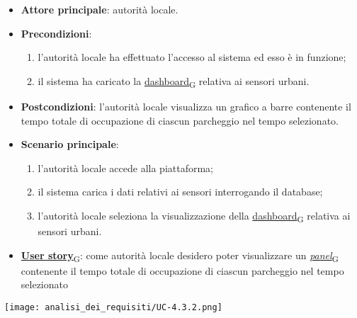 \newpage
{}
\begin{itemize}
	\item \textbf{Attore principale}: autorità locale.
	\item \textbf{Precondizioni}:
	      \begin{enumerate}
		      \item l'autorità locale ha effettuato l'accesso al sistema ed esso è in funzione;
		      \item il sistema ha caricato la \href{https://7last.github.io/docs/pb/documentazione-interna/glossario\#dashboard}{dashboard\textsubscript{G}} relativa ai sensori urbani.
	      \end{enumerate}
	\item \textbf{Postcondizioni}: l'autorità locale visualizza un grafico a barre contenente il tempo totale di occupazione di ciascun parcheggio nel tempo selezionato.
	\item \textbf{Scenario principale}:
	      \begin{enumerate}
		      \item l'autorità locale accede alla piattaforma;
		      \item il sistema carica i dati relativi ai sensori interrogando il database;
		      \item l'autorità locale seleziona la visualizzazione della \href{https://7last.github.io/docs/pb/documentazione-interna/glossario\#dashboard}{dashboard\textsubscript{G}} relativa ai sensori urbani.
	      \end{enumerate}
	\item \href{https://7last.github.io/docs/pb/documentazione-interna/glossario\#user-story}{\textbf{User story}\textsubscript{G}}:
	      come autorità locale desidero poter visualizzare un \href{https://7last.github.io/docs/pb/documentazione-interna/glossario\#panel}{\textit{panel}\textsubscript{G}} contenente il tempo totale di occupazione di ciascun parcheggio nel tempo selezionato
\end{itemize}
\begin{center}
	\texttt{[image: analisi\_dei\_requisiti/UC-4.3.2.png]}
\end{center}

